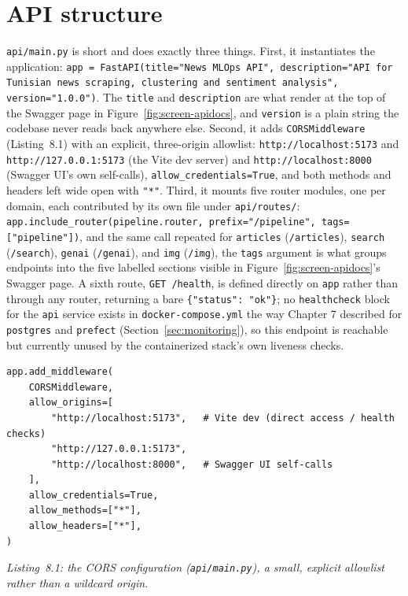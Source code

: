 \section{API structure}
\label{sec:api-structure}
\begin{sloppypar}
\texttt{api/\allowbreak main.py} is short and does exactly three things. First, it instantiates the application: \texttt{app = FastAPI(title="News MLOps API", description="API for Tunisian news scraping, clustering and sentiment analysis", version="1.0.0")}. The \texttt{title} and \texttt{description} are what render at the top of the Swagger page in Figure~\ref{fig:screen-apidocs}, and \texttt{version} is a plain string the codebase never reads back anywhere else. Second, it adds \texttt{CORSMiddleware} (Listing~8.1) with an explicit, three-origin allowlist: \texttt{http://localhost:5173} and \texttt{http://127.0.0.1:5173} (the Vite dev server) and \texttt{http://localhost:8000} (Swagger UI's own self-calls), \texttt{allow\_credentials=True}, and both methods and headers left wide open with \texttt{"*"}. Third, it mounts five router modules, one per domain, each contributed by its own file under \texttt{api/\allowbreak routes/}: \texttt{app.include\_router(pipeline.router, prefix="/pipeline", tags=["pipeline"])}, and the same call repeated for \texttt{articles} (\texttt{/articles}), \texttt{search} (\texttt{/search}), \texttt{genai} (\texttt{/genai}), and \texttt{img} (\texttt{/img}), the \texttt{tags} argument is what groups endpoints into the five labelled sections visible in Figure~\ref{fig:screen-apidocs}'s Swagger page. A sixth route, \texttt{GET /health}, is defined directly on \texttt{app} rather than through any router, returning a bare \texttt{\{"status": "ok"\}}; no \texttt{healthcheck} block for the \texttt{api} service exists in \texttt{docker-compose.yml} the way Chapter 7 described for \texttt{postgres} and \texttt{prefect} (Section~\ref{sec:monitoring}), so this endpoint is reachable but currently unused by the containerized stack's own liveness checks.
\end{sloppypar}

\begin{verbatim}
app.add_middleware(
    CORSMiddleware,
    allow_origins=[
        "http://localhost:5173",   # Vite dev (direct access / health checks)
        "http://127.0.0.1:5173",
        "http://localhost:8000",   # Swagger UI self-calls
    ],
    allow_credentials=True,
    allow_methods=["*"],
    allow_headers=["*"],
)
\end{verbatim}
\begin{center}
\textit{Listing~8.1: the CORS configuration (\texttt{api/main.py}), a small, explicit allowlist rather than a wildcard origin.}
\end{center}

